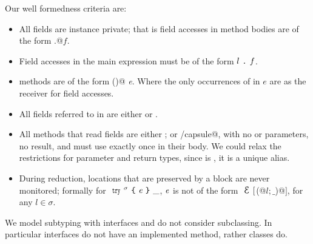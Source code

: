  Our well formedness criteria are:
\begin{itemize}
\item All fields are instance private; that is field accesses in method bodies are of the form
\Q@this.@$f$.

\item Field accesses in the main expression
must be of the form $l{ \mbox{ {\texttt{.}} } }\mathit{f}$.

\item \Q@invariant@ methods are of the form \Q@read@ \Q@method@ \Q@Bool@ \Q@invariant()@ \emph{e}.
Where the only occurrences of \Q@this@ in $e$ are as the receiver for field accesses.
\item All fields referred to in \Q@invariant@ are either \Q@imm@ or \Q@capsule@.
\item All methods that read \Q@capsule@ fields
are either \Q@read@;
or \Q@mut/capsule@, with no \Q@mut@ or \Q@read@ parameters, no \Q@mut@ result, and 
must use \Q@this@ exactly once in their body. We could relax the restrictions for parameter and return types, since \Q@this@ is \Q@capsule@, it is a unique alias.
\item 
During reduction, locations that are preserved by a \Q@try@ block are
never monitored; formally 
for $\Kw{try}^\sigma\oC\e\cC\_$, ${\mathit{e}}$ is not of the form $\ctx[$\Q@M(@$l;\_$\Q@)@$]$, for any $l\in\sigma$.
\end{itemize}

\noindent We model subtyping with interfaces 
and do not consider subclassing.
In particular interfaces do not have an implemented \Q@invariant@ method, rather classes do.
\newcommand{\rowSpace}{\\\vspace{2.5ex}}

